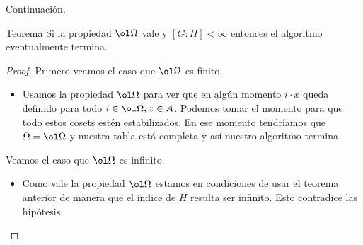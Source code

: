 \documentclass[aspectratio=169, 9pt]{beamer}
\begin{document}
\begin{frame}[fragile]{Continuación.}
	\begin{alertblock}{Teorema}
		Si la propiedad $\ol \Omega$ vale y $[G:H] < \infty$ entonces el algoritmo eventualmente termina.
	\end{alertblock}
	
	
	\pause
\begin{proof}
	\pause
		Primero veamos el caso que $\ol \Omega$ es finito.
	\begin{itemize}
		\pause
		\item Usamos la propiedad $\ol \Omega$ para ver que en algún momento $i \cdot x$ queda definido para todo $i \in \ol\Omega, x \in A$.
		\pause 
		Podemos tomar el momento para que todo estos cosets estén estabilizados.
		\pause
		En ese momento tendríamos que $\Omega = \ol \Omega$ y nuestra tabla está completa y así nuestro algoritmo termina.
	\end{itemize}
	\pause
	Veamos el caso que $\ol \Omega$ es infinito.
	\begin{itemize}
		\pause
		\item Como vale la propiedad $\ol \Omega$ estamos en condiciones de usar el teorema anterior de manera que el índice de $H$ resulta ser infinito.
		Esto contradice las hipótesis.
		
	\end{itemize}
		
\end{proof}
	
	
\end{frame}
\end{document}
